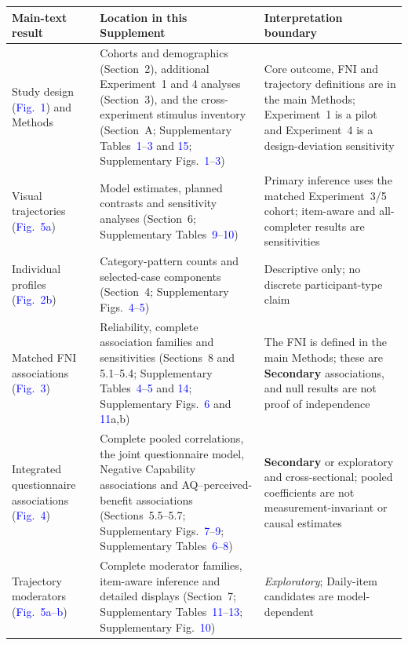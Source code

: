 \begin{center}
\footnotesize
\begin{tabularx}{\textwidth}{@{}>{\raggedright\arraybackslash}p{3.2cm}>{\raggedright\arraybackslash}p{5.6cm}>{\raggedright\arraybackslash}X@{}}
\toprule
Main-text result & Location in this Supplement & Interpretation boundary \\
\midrule
Study design (\textcolor{blue}{Fig.~1}) and Methods & Cohorts and demographics (Section~2), additional Experiment~1 and 4 analyses (Section~3), and the cross-experiment stimulus inventory (Section~A; Supplementary Tables~\textcolor{blue}{1}--\textcolor{blue}{3} and \textcolor{blue}{15}; Supplementary Figs.~\textcolor{blue}{1}--\textcolor{blue}{3}) & Core outcome, FNI and trajectory definitions are in the main Methods; Experiment~1 is a pilot and Experiment~4 is a design-deviation sensitivity \\
Visual trajectories (\textcolor{blue}{Fig.~5a}) & Model estimates, planned contrasts and sensitivity analyses (Section~6; Supplementary Tables~\textcolor{blue}{9}--\textcolor{blue}{10}) & Primary inference uses the matched Experiment~3/5 cohort; item-aware and all-completer results are sensitivities \\
Individual profiles (\textcolor{blue}{Fig.~2b}) & Category-pattern counts and selected-case components (Section~4; Supplementary Figs.~\textcolor{blue}{4}--\textcolor{blue}{5}) & Descriptive only; no discrete participant-type claim \\
Matched FNI associations (\textcolor{blue}{Fig.~3}) & Reliability, complete association families and sensitivities (Sections~8 and 5.1--5.4; Supplementary Tables~\textcolor{blue}{4}--\textcolor{blue}{5} and \textcolor{blue}{14}; Supplementary Figs.~\textcolor{blue}{6} and \textcolor{blue}{11}a,b) & The FNI is defined in the main Methods; these are \textbf{Secondary} associations, and null results are not proof of independence \\
Integrated questionnaire associations (\textcolor{blue}{Fig.~4}) & Complete pooled correlations, the joint questionnaire model, Negative Capability associations and AQ--perceived-benefit associations (Sections~5.5--5.7; Supplementary Figs.~\textcolor{blue}{7}--\textcolor{blue}{9}; Supplementary Tables~\textcolor{blue}{6}--\textcolor{blue}{8}) & \textbf{Secondary} or exploratory and cross-sectional; pooled coefficients are not measurement-invariant or causal estimates \\
Trajectory moderators (\textcolor{blue}{Fig.~5a--b}) & Complete moderator families, item-aware inference and detailed displays (Section~7; Supplementary Tables~\textcolor{blue}{11}--\textcolor{blue}{13}; Supplementary Fig.~\textcolor{blue}{10}) & \textit{Exploratory}; Daily-item candidates are model-dependent \\

\end{tabularx}
\end{center}
